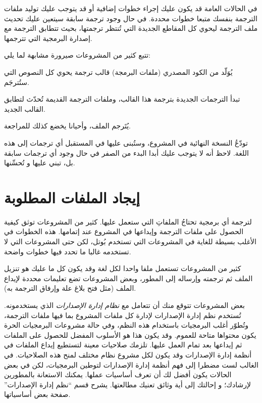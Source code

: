 في الحالات العامة قد يكون عليك إجراء خطوات إضافية أو قد يتوجب عليك توليد
ملفات الترجمة بنفسك متبعا خطوات محددة. في حال وجود ترجمة سابقة سيتعين
عليك تحديث ملف الترجمة ليحوي كل المقاطع الجديدة التي تُنتظر ترجمتها،
بحيث تتطابق الترجمة مع إصدارة البرمجية التي تترجمها.

تتبع كثير من المشروعات صيرورة مشابهة لما يلي:

  

\startitemize[1]
\item يُوَلّد من الكود المصدري (ملفات البرمجة) قالب ترجمة يحوي كل النصوص
التي ستُترجَم.
\item تبدأ الترجمات الجديدة بترجمة هذا القالب، وملفات الترجمة القديمة
تُحدّث لتطابق القالب الجديد.
\item يُتَرجم الملف، وأحيانا يخضع كذلك للمراجعة.
\item تودّعُ النسخة النهائية في المشروع، وستُبنى عليها في المستقبل أي
ترجمات إلى هذه اللغة.
\stopitemize
لاحظ أنه لا يتوجب عليك أبدا البدء من الصفر في حال وجود أي ترجمات سابقة
بل، تبني عليها و تُحسِّنها.

\section{إيجاد الملفات المطلوبة}
لترجمة أي برمجية تحتاجُ الملفاتِ التي ستعمل عليها. كثير من المشروعات
توثق كيفية الحصول على ملفات الترجمة وإيداعها في المشروع عند إتمامها.
هذه الخطوات في الأغلب بسيطة للغاية في المشروعات التي تستخدم بُوتل، لكن
حتى المشروعات التي لا تستخدمه غالبا ما تحدد فيها خطوات واضحة.

كثير من المشروعات تستعمل ملفا واحدا لكل لغة وقد يكون كل ما عليك هو تنزيل
الملف ثم ترجمته وإرساله إلى المطور، وبعض المشروعات تضع تعليمات محددة
لإيداع الملف (مثل فتح بلاغ علة وإرفاق الترجمة به).

بعض المشروعات تتوقع منك أن تتعامل مع {\it نظام إدارة الإصدارات} الذي
يستخدمونه. تُستخدم نظم إدارة الإصدارات لإدارة كل ملفات المشروع بما فيها
ملفات الترجمة، وتُطوّر أغلب البرمجيات باستخدام هذه النظم، وفي حالة
مشروعات البرمجيات الحرة يكون محتواها متاحة للعموم. وقد يكون هذا هو
الأسلوب المفضل للحصول على الملفات ثم إيداعها بعد تمام العمل عليها.
تلزمك صلاحيات معينة لتستطيع إيداع الملفات في أنظمة إدارة الإصدارات وقد
يكون لكل مشروع نظام مختلف لمنح هذه الصلاحيات. في الغالب لست مضطرا إلى
فهم أنظمة إدارة الإصدارات لتوطين البرمجيات، لكن في بعض الحالات يكون
أفضل لك أن تعرف أساسيات عملها. يمكنك الاستعانة بالمطورين لإرشادك؛ و
إحالتك إلى أية وثائق تعنيك مطالعتها. يشرح قسم “نظم إدارة الإصدارات”
صفحة \at[ref:34384626] بعض أساسياتها.

